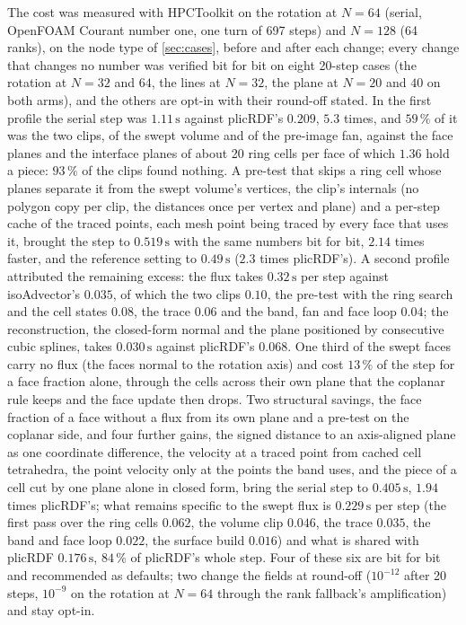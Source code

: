 \documentclass[preprint,12pt]{elsarticle}
\begin{document}
The cost was measured with HPCToolkit on the rotation at $N = 64$ (serial, OpenFOAM Courant number one, one turn of 697 steps) and $N = 128$ (64 ranks), on the node type of \cref{sec:cases}, before and after each change; every change that changes no number was verified bit for bit on eight 20-step cases (the rotation at $N = 32$ and $64$, the lines at $N = 32$, the plane at $N = 20$ and $40$ on both arms), and the others are opt-in with their round-off stated. In the first profile the serial step was $1.11\,\mathrm{s}$ against plicRDF's $0.209$, $5.3$ times, and $59\,\%$ of it was the two clips, of the swept volume and of the pre-image fan, against the face planes and the interface planes of about 20 ring cells per face of which $1.36$ hold a piece: $93\,\%$ of the clips found nothing. A pre-test that skips a ring cell whose planes separate it from the swept volume's vertices, the clip's internals (no polygon copy per clip, the distances once per vertex and plane) and a per-step cache of the traced points, each mesh point being traced by every face that uses it, brought the step to $0.519\,\mathrm{s}$ with the same numbers bit for bit, $2.14$ times faster, and the reference setting to $0.49\,\mathrm{s}$ ($2.3$ times plicRDF's). A second profile attributed the remaining excess: the flux takes $0.32\,\mathrm{s}$ per step against isoAdvector's $0.035$, of which the two clips $0.10$, the pre-test with the ring search and the cell states $0.08$, the trace $0.06$ and the band, fan and face loop $0.04$; the reconstruction, the closed-form normal and the plane positioned by consecutive cubic splines, takes $0.030\,\mathrm{s}$ against plicRDF's $0.068$. One third of the swept faces carry no flux (the faces normal to the rotation axis) and cost $13\,\%$ of the step for a face fraction alone, through the cells across their own plane that the coplanar rule keeps and the face update then drops. Two structural savings, the face fraction of a face without a flux from its own plane and a pre-test on the coplanar side, and four further gains, the signed distance to an axis-aligned plane as one coordinate difference, the velocity at a traced point from cached cell tetrahedra, the point velocity only at the points the band uses, and the piece of a cell cut by one plane alone in closed form, bring the serial step to $0.405\,\mathrm{s}$, $1.94$ times plicRDF's; what remains specific to the swept flux is $0.229\,\mathrm{s}$ per step (the first pass over the ring cells $0.062$, the volume clip $0.046$, the trace $0.035$, the band and face loop $0.022$, the surface build $0.016$) and what is shared with plicRDF $0.176\,\mathrm{s}$, $84\,\%$ of plicRDF's whole step. Four of these six are bit for bit and recommended as defaults; two change the fields at round-off ($10^{-12}$ after 20 steps, $10^{-9}$ on the rotation at $N = 64$ through the rank fallback's amplification) and stay opt-in.
\end{document}
